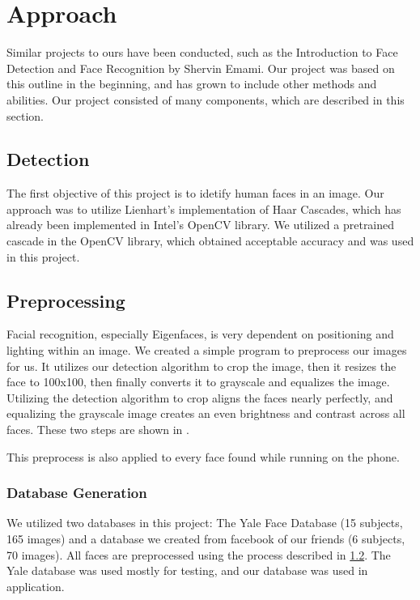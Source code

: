 \section{Approach} %

Similar projects to ours have been conducted, such as the Introduction
to Face Detection and Face Recognition by Shervin Emami\cite{Emami}.
Our project was based on this outline in the beginning, and has grown
to include other methods and abilities.  Our project consisted of many
components, which are described in this section.

\subsection{Detection}

The first objective of this project is to idetify human faces in an
image.  Our approach was to utilize Lienhart's implementation
\cite{Lienhart} of Haar Cascades, which has already been implemented
in Intel's OpenCV library. \cite{opencv} We utilized a pretrained
cascade in the OpenCV library, which obtained acceptable accuracy and
was used in this project.

\subsection{Preprocessing}\label{preprocess}

Facial recognition, especially Eigenfaces, is very dependent on
positioning and lighting within an image.  We created a simple program
to preprocess our images for us.  It utilizes our detection algorithm
to crop the image, then it resizes the face to 100x100, then finally
converts it to grayscale and equalizes the image.  Utilizing the
detection algorithm to crop aligns the faces nearly perfectly, and
equalizing the grayscale image creates an even brightness and contrast
across all faces. These two steps are shown in
.


This preprocess is also applied to every face found while running on
the phone.

\subsubsection{Database Generation}

We utilized two databases in this project: The Yale Face Database
\cite{Yaleface} (15 subjects, 165 images) and a database we created
from facebook of our friends (6 subjects, 70 images).  All faces are
preprocessed using the process described in \ref{preprocess}.  The
Yale database was used mostly for testing, and our database was used
in application.

